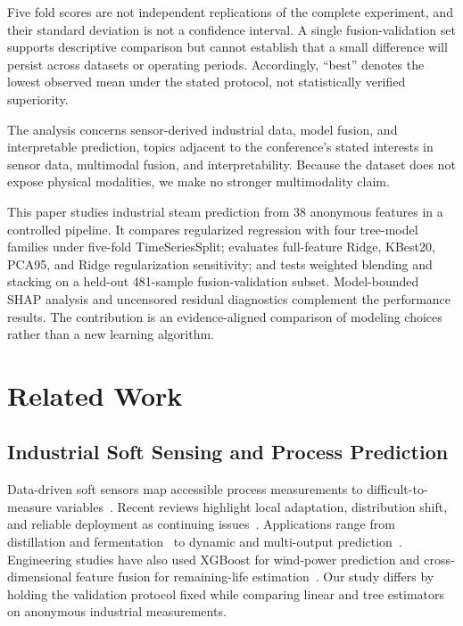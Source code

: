 \documentclass[sigconf,screen,review,anonymous]{acmart}
\begin{document}
Five fold scores are not independent replications of the complete experiment, and their standard deviation is not a confidence interval. A single fusion-validation set supports descriptive comparison but cannot establish that a small difference will persist across datasets or operating periods. Accordingly, ``best'' denotes the lowest observed mean under the stated protocol, not statistically verified superiority.

The analysis concerns sensor-derived industrial data, model fusion, and interpretable prediction, topics adjacent to the conference's stated interests in sensor data, multimodal fusion, and interpretability. Because the dataset does not expose physical modalities, we make no stronger multimodality claim.

This paper studies industrial steam prediction from 38 anonymous features in a controlled pipeline. It compares regularized regression with four tree-model families under five-fold TimeSeriesSplit; evaluates full-feature Ridge, KBest20, PCA95, and Ridge regularization sensitivity; and tests weighted blending and stacking on a held-out 481-sample fusion-validation subset. Model-bounded SHAP analysis and uncensored residual diagnostics complement the performance results. The contribution is an evidence-aligned comparison of modeling choices rather than a new learning algorithm.

\section{Related Work}
\subsection{Industrial Soft Sensing and Process Prediction}
Data-driven soft sensors map accessible process measurements to difficult-to-measure variables~\cite{kadlec2009softsensor}. Recent reviews highlight local adaptation, distribution shift, and reliable deployment as continuing issues~\cite{yeo2023jit,sheng2024review,perera2023ai_softsensor}. Applications range from distillation and fermentation~\cite{botha2021industrial_softsensor,hua2023rf_feature_selection} to dynamic and multi-output prediction~\cite{li2020seq2seq_lightgbm,wan2024wide_rf}. Engineering studies have also used XGBoost for wind-power prediction and cross-dimensional feature fusion for remaining-life estimation~\cite{wang2023zju_wind_xgboost,zhang2025zju_feature_fusion}. Our study differs by holding the validation protocol fixed while comparing linear and tree estimators on anonymous industrial measurements.
\end{document}
